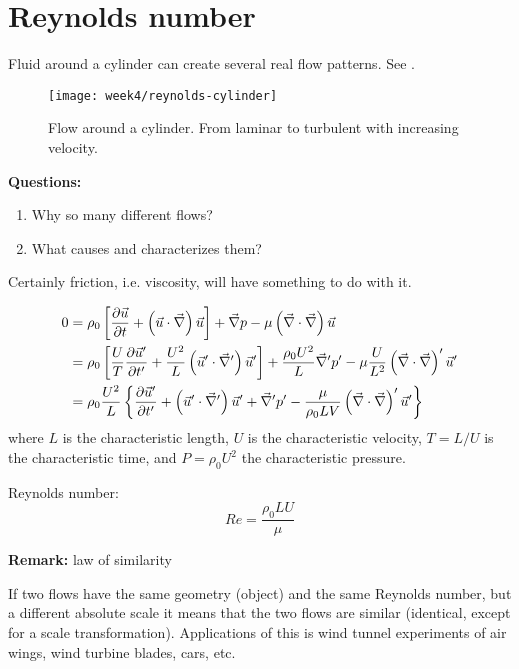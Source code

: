 \section{Reynolds number}
Fluid around a cylinder can create several real flow patterns. See .

\begin{figure}[p]
    \centering
    \texttt{[image: week4/reynolds-cylinder]}\\
    \caption{Flow around a cylinder. From laminar to turbulent with increasing velocity.}
    \label{fig:reynolds-cylinder}
\end{figure}

\textbf{Questions:}
\begin{enumerate}
\item Why so many different flows?
\item What causes and characterizes them?
\end{enumerate}
Certainly friction, i.e. viscosity, will have something to do with it.

\begin{align}
0 &= \rho_0 \left[\frac{\partial \vec{u}}{\partial t}+\left(\vec{u}\cdot\vec{\nabla}\right)\vec{u}\right] + \vec{\nabla}p - \mu \left(\vec{\nabla}\cdot\vec{\nabla}\right) \vec{u} \\
&= \rho_0\left[\frac{U}{T}\frac{\partial \vec{u}'}{\partial t'}+\frac{U^2}{L}\left(\vec{u}'\cdot\vec{\nabla}'\right)\vec{u}'\right] + \frac{\rho_0 U^2}{L}\vec{\nabla}'p'-\mu\frac{U}{L^2}\left(\vec{\nabla}\cdot\vec{\nabla}\right)'\vec{u}' \\
&= \rho_0\frac{U^2}{L} \left\lbrace \frac{\partial \vec{u}'}{\partial t'}+\left(\vec{u}'\cdot\vec{\nabla}'\right)\vec{u}'+\vec{\nabla}'p'-\frac{\mu}{\rho_0 LV} \left(\vec{\nabla}\cdot\vec{\nabla}\right)'\vec{u}' \right\rbrace
\end{align}
where $L$ is the characteristic length, $U$ is the characteristic velocity, $T=L/U$ is the characteristic time, and $P=\rho_0U^2$ the characteristic pressure.

Reynolds number:
\begin{equation}
Re = \frac{\rho_0 L U}{\mu}
\label{eq: Re number}
\end{equation}

\begin{framed}
\textbf{Remark:} law of similarity

If two flows have the same geometry (object) and the same Reynolds number, but a different absolute scale it means that the two flows are similar (identical, except for a scale transformation). Applications of this is wind tunnel experiments of air wings, wind turbine blades, cars, etc.
\end{framed}


